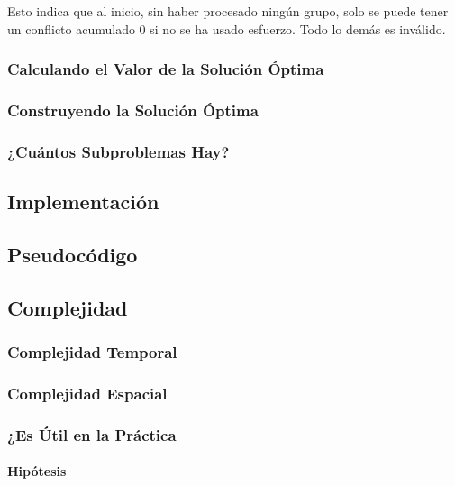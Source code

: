\documentclass[11pt,letter]{article}
\begin{document}
\begin{itemize}
        Esto indica que al inicio, sin haber procesado ningún grupo, solo se puede tener un conflicto acumulado 0 si no se ha usado esfuerzo. Todo lo demás es inválido.

        \subsubsection{Calculando el Valor de la Solución Óptima}

        \subsubsection{Construyendo la Solución Óptima}

        \subsubsection{¿Cuántos Subproblemas Hay?}

        \subsection{Implementación}

        \subsection{Pseudocódigo}

        \subsection{Complejidad}

        \subsubsection{Complejidad Temporal}

        \subsubsection{Complejidad Espacial}

        \subsubsection{¿Es Útil en la Práctica}

        \paragraph{Hipótesis}


\end{itemize}
\end{document}
